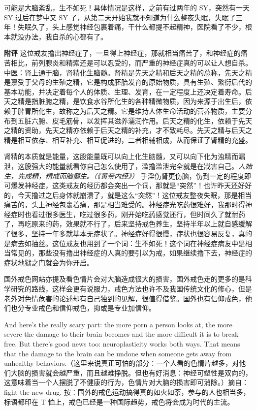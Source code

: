 \begin{case}
    可能是大脑紊乱，生不如死！具体情况是这样，之前有过两年的 SY，突然有一天 SY 过后在梦中又 SY 了，从第二天开始我就不知道为什么整夜失眠，失眠了三年！失眠久了，头上感觉神经包裹着痛，干什么都提不起精神，医院看了不少，根本就没办法，我自杀的心都有了。

    \textbf{附评} 这位戒友撸出神经症了，一旦得上神经症，那就相当痛苦了，和神经症的痛苦相比，前列腺炎和精索还是可以忍受的，而严重的神经症真的可以让人想自杀。中医：肾上通于脑，肾精化生脑髓。肾精是先天之精和后天之精的总称，先天之精是禀受于父母的生殖之精，它是构成胚胎发育的原始物质，具有生殖、繁衍后代的基本功能，并决定着每个人的体质、生理、发育，在一定程度上还决定着寿命。后天之精是指脏腑之精，是饮食水谷所化生的各种精微物质，因为来源于出生后，依赖于脾胃所化生，故称之为后天之精。它是维持人体生命活动的营养物质，主要分布到五脏六腑、皮毛筋骨，以发挥其滋养濡润作用。后天之精的化生，依赖于先天之精的资助，先天之精亦依赖于后天之精的补充，才不致耗尽。先天之精与后天之精是相互依存、相互补充、相互促进的，二者相辅相成，从而保证了肾精的充盛。

    肾精的本质就是能量，这股能量既可以向上化生脑髓，又可以向下化为浊精而漏泄，这股强大的能量就看你自己怎么使用了，滥撸滥泄完全就是在戕害自己。\textit{人始生，先成精，精成而脑髓生。（《黄帝内经》）} 手淫伤肾更伤脑，伤到一定的程度即可爆发神经症，这类戒友的经历都会突出一个词，那就是“突然”！也许昨天还好好的，今天撸过之后身体就崩溃了，就是这么“突然”！这位戒友整夜失眠，那是相当痛苦的，头上神经包裹着痛，那是相当难受的。神经症光吃药很难好，我那时得神经症时也看过很多医生，吃过很多药，刚开始吃药感觉还行，但时间久了就耐药了，再吃原来的药，效果就不行了，后来坚持戒色养生，坚持半年以上就自感缓解了很多，坚持一年多就基本无症状了。神经症好得很慢，症状也很容易反复，真的是病去如抽丝。这位戒友也用到了一个词：生不如死！这个词在神经症病友中是相当常见的，那些没有撸出神经症的人真的要引以为戒，如果继续撸下去，神经症的症状地狱之门就会为你开启。

    国外戒色网站亦提及看色情片会对大脑造成很大的损害，国外戒色走的更多的是科学研究的路线，这样会更有说服力，戒色方法也许不及我国传统文化的修心，但是老外对色情危害的论述却有自己独到的见解，很值得借鉴。国外也有信仰戒色，他们也分专业戒色和信仰戒色，抑或是专业加信仰。

    And here’s the really scary part: the more porn a person looks at, the more severe the damage to their brain becomes and the more difficult it is to break free. But there’s good news too: neuroplasticity works both ways. That means that the damage to the brain can be undone when someone gets away from unhealthy behaviors.（这里来说真正可怕的部分：一个人看的色情片越多，对他们大脑的损害就会越严重，而且越难挣脱。但也有好消息：神经可塑性是双向的，这意味着当一个人摆脱了不健康的行为，色情片对大脑的损害即可消除。）摘自：fight the new drug. 按：国外的戒色运动搞得真的如火如荼，参与的人也相当多，标语都印在 T 恤上，戒色已经是一种国际趋势，戒色将会成为时代的主流。
\end{case}

